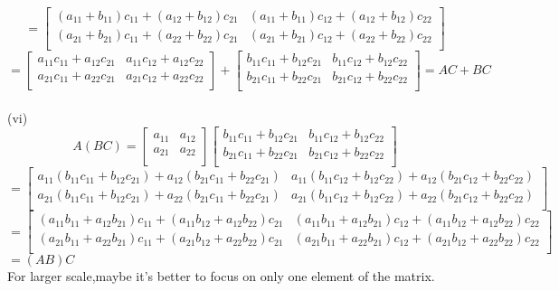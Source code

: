 \documentclass{article}
\begin{document}
\[
=
\begin{bmatrix}
(a_{11} + b_{11})c_{11} + (a_{12} + b_{12})c_{21} & (a_{11} + b_{11})c_{12} + (a_{12} + b_{12})c_{22} \\
(a_{21} + b_{21})c_{11} + (a_{22} + b_{22})c_{21} & (a_{21} + b_{21})c_{12} + (a_{22} + b_{22})c_{22} \\
\end{bmatrix}
\]
\[
=
\begin{bmatrix}
a_{11}c_{11} + a_{12}c_{21} & a_{11}c_{12} + a_{12}c_{22} \\
a_{21}c_{11}+ a_{22}c_{21}& a_{21}c_{12} + a_{22}c_{22} \\
\end{bmatrix}
+
\begin{bmatrix}
b_{11}c_{11} + b_{12}c_{21} & b_{11}c_{12} + b_{12}c_{22} \\
b_{21}c_{11}+ b_{22}c_{21}& b_{21}c_{12} + b_{22}c_{22} \\
\end{bmatrix}
=AC+BC
\]
\\(vi)
\[
A(BC) =
\begin{bmatrix}
a_{11} & a_{12} \\
a_{21} & a_{22} \\
\end{bmatrix}
\begin{bmatrix}
b_{11}c_{11} + b_{12}c_{21} & b_{11}c_{12} + b_{12}c_{22} \\
b_{21}c_{11} + b_{22}c_{21} & b_{21}c_{12} + b_{22}c_{22} \\
\end{bmatrix}
\]
\[
=
\begin{bmatrix}
a_{11}(b_{11}c_{11} + b_{12}c_{21}) + a_{12}(b_{21}c_{11} + b_{22}c_{21}) & a_{11}(b_{11}c_{12} + b_{12}c_{22}) + a_{12}(b_{21}c_{12} + b_{22}c_{22}) \\
a_{21}(b_{11}c_{11} + b_{12}c_{21}) + a_{22}(b_{21}c_{11} + b_{22}c_{21}) & a_{21}(b_{11}c_{12} + b_{12}c_{22}) + a_{22}(b_{21}c_{12} + b_{22}c_{22}) \\
\end{bmatrix}
\]
\[
=
\begin{bmatrix}
(a_{11}b_{11}+a_{12}b_{21})c_{11} +(a_{11}b_{12}+a_{12}b_{22})c_{21}& (a_{11}b_{11}+a_{12}b_{21})c_{12} +(a_{11}b_{12}+a_{12}b_{22})c_{22} \\
(a_{21}b_{11}+a_{22}b_{21})c_{11} +(a_{21}b_{12}+a_{22}b_{22})c_{21} & (a_{21}b_{11}+a_{22}b_{21})c_{12} +(a_{21}b_{12}+a_{22}b_{22})c_{22}\\
\end{bmatrix}
\]
$
= (AB)C  
$ \\For larger scale,maybe it's better to focus on only one element of the matrix.
\end{document}
